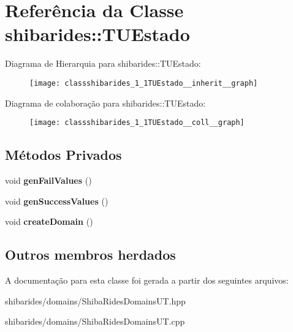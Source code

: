 \hypertarget{classshibarides_1_1TUEstado}{}\section{Referência da Classe shibarides\+:\+:T\+U\+Estado}
\label{classshibarides_1_1TUEstado}


Diagrama de Hierarquia para shibarides\+:\+:T\+U\+Estado\+:\nopagebreak
\begin{figure}[H]
\begin{center}
\leavevmode
\texttt{[image: classshibarides\_1\_1TUEstado\_\_inherit\_\_graph]}
\end{center}
\end{figure}


Diagrama de colaboração para shibarides\+:\+:T\+U\+Estado\+:\nopagebreak
\begin{figure}[H]
\begin{center}
\leavevmode
\texttt{[image: classshibarides\_1\_1TUEstado\_\_coll\_\_graph]}
\end{center}
\end{figure}
\subsection*{Métodos Privados}
\begin{DoxyCompactItemize}
\item 
void {\bfseries gen\+Fail\+Values} ()\hypertarget{classshibarides_1_1TUEstado_ab00d8cf1b69df380a241be507d84a044}{}\label{classshibarides_1_1TUEstado_ab00d8cf1b69df380a241be507d84a044}

\item 
void {\bfseries gen\+Success\+Values} ()\hypertarget{classshibarides_1_1TUEstado_a53162396ea238518f94d458285492970}{}\label{classshibarides_1_1TUEstado_a53162396ea238518f94d458285492970}

\item 
void {\bfseries create\+Domain} ()\hypertarget{classshibarides_1_1TUEstado_ab26d507b1cd22d6f47c3bf24d5a78c18}{}\label{classshibarides_1_1TUEstado_ab26d507b1cd22d6f47c3bf24d5a78c18}

\end{DoxyCompactItemize}
\subsection*{Outros membros herdados}


A documentação para esta classe foi gerada a partir dos seguintes arquivos\+:\begin{DoxyCompactItemize}
\item 
shibarides/domains/Shiba\+Rides\+Domains\+U\+T.\+hpp\item 
shibarides/domains/Shiba\+Rides\+Domains\+U\+T.\+cpp\end{DoxyCompactItemize}
